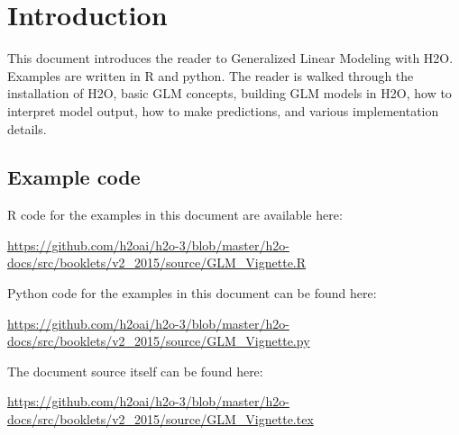 \newpage

\tableofcontents


\newpage

\section{Introduction}
This document introduces the reader to Generalized Linear Modeling with H2O.  Examples are written in R and python.
The reader is walked through the installation of H2O, basic GLM concepts, building GLM models in H2O, how to
interpret model output, how to make predictions, and various implementation details.





\newpage

\newcommand{\waterVersion}{3.0.1.4}


\subsection{Example code}

R code for the examples in this document are available here:

\url{https://github.com/h2oai/h2o-3/blob/master/h2o-docs/src/booklets/v2_2015/source/GLM_Vignette.R}

Python code for the examples in this document can be found here:

\url{https://github.com/h2oai/h2o-3/blob/master/h2o-docs/src/booklets/v2_2015/source/GLM_Vignette.py}

The document source itself can be found here:

\url{https://github.com/h2oai/h2o-3/blob/master/h2o-docs/src/booklets/v2_2015/source/GLM_Vignette.tex}


